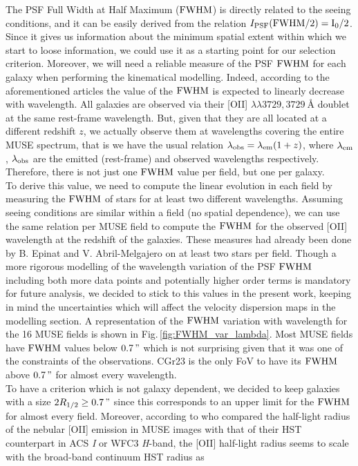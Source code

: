 The PSF Full Width at Half Maximum ($\rm{FWHM}$) is directly related to the seeing conditions, and it can be easily derived from the relation $I_{\rm{PSF}} ( \rm{FWHM}/2) = I_0 /2$. Since it gives us information about the minimum spatial extent within which we start to loose information, we could use it as a starting point for our selection criterion. Moreover, we will need a reliable measure of the PSF $\rm{FWHM}$ for each galaxy when performing the kinematical modelling. Indeed, according to the aforementioned articles the value of the $\rm{FWHM}$ is expected to linearly decrease with wavelength. All galaxies are observed via their [OII] $\lambda\lambda 3729, \SI{3729}{\angstrom}$ doublet at the same rest-frame wavelength. But, given that they are all located at a different redshift $z$, we actually observe them at wavelengths covering the entire MUSE spectrum, that is we have the usual relation $\lambda_{\rm{obs}} = \lambda_{\rm{em}} ( 1 + z )$, where $\lambda_{\rm{em}}$, $\lambda_{\rm{obs}}$ are the emitted (rest-frame) and observed wavelengths respectively. Therefore, there is not just one $\rm{FWHM}$ value per field, but one per galaxy. \\

To derive this value, we need to compute the linear evolution in each field by measuring the $\rm{FWHM}$ of stars for at least two different wavelengths. Assuming seeing conditions are similar within a field (no spatial dependence), we can use the same relation per MUSE field to compute the $\rm{FWHM}$ for the observed [OII] wavelength at the redshift of the galaxies. These measures had already been done by B. Epinat and V. Abril-Melgajero on at least two stars per field. Though a more rigorous modelling of the wavelength variation of the PSF $\rm{FWHM}$ including both more data points and potentially higher order terms is mandatory for future analysis, we decided to stick to this values in the present work, keeping in mind the uncertainties which will affect the velocity dispersion maps in the modelling section. A representation of the $\rm{FWHM}$ variation with wavelength for the 16 MUSE fields is shown in Fig.\,\ref{fig:FWHM_var_lambda}. Most MUSE fields have $\rm{FWHM}$ values below $\SI{0.7}{"}$ which is not surprising given that it was one of the constraints of the observations. CGr23 is the only FoV to have its $\rm{FWHM}$ above $\SI{0.7}{"}$ for almost every wavelength.\\

To have a criterion which is not galaxy dependent, we decided to keep galaxies with a size $2 R_{1/2} \geq \SI{0.7}{"}$ since this corresponds to an upper limit for the $\rm{FWHM}$ for almost every field. Moreover, according to  who compared the half-light radius of the nebular [OII] emission in MUSE images with that of their HST counterpart in ACS \textit{I} or WFC3 \textit{H}-band, the [OII] half-light radius seems to scale with the broad-band continuum HST radius as 

